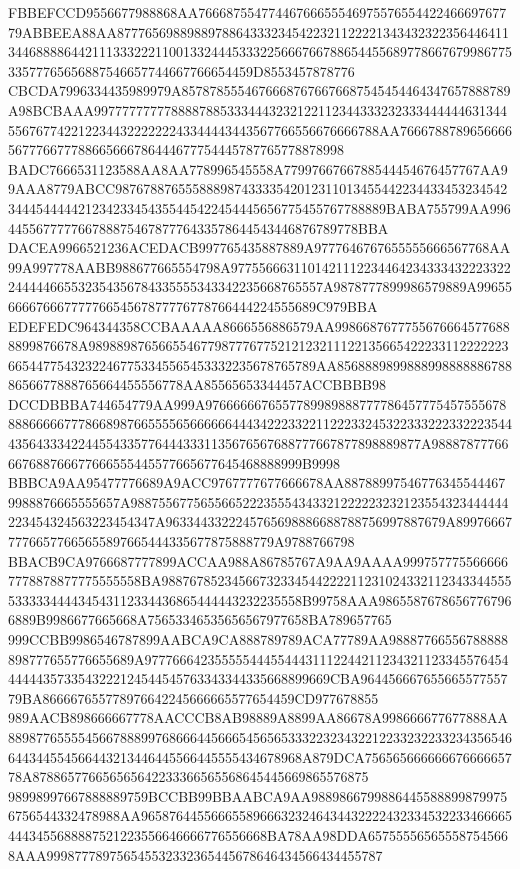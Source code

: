 FBBEFCCD9556677988868AA7666875547744676665554697557655442246669767779ABBEEA88AA8777656988988978864333234542232112222134343232235644641134468888644211133322211001332444533322566676678865445568977866767998677533577765656887546657744667766654459D8553457878776
CBCDA7996334435989979A85787855546766687676676687545454464347657888789A98BCBAAA9977777777788887885333444323212211234433323233344444463134455676774221223443222222243344443443567766556676666788AA7666788789656666567776677788665666786444677754445787765778878998
BADC7666531123588AA8AA778996545558A7799766766788544454676457767AA99AAA8779ABCC98767887655588898743333542012311013455442234433453234542344454444421234233454355445422454445656775455767788889BABA755799AA99644556777776678887546787776433578644543446876789778BBA
DACEA9966521236ACEDACB997765435887889A9777646767655555666567768AA99A997778AABB988677665554798A9775566631101421112234464234333432223322244444665532354356784335555343342235668765557A9878777899986579889A9965566667666777776654567877776778766444224555689C979BBA
EDEFEDC964344358CCBAAAAA8666556886579AA99866876777556766645776888899876678A98988987656655467798777677521212321112213566542223311222222366544775432322467753345565453332235678765789AA85688898998889988888867888656677888765664455556778AA85565653344457ACCBBBB98
DCCDBBBA744654779AA999A976666667655778998988877778645777545755567888866666777866898766555565666666444342223322112223324532233322233222354443564333422445543357764443331135676567688777667877898889877A98887877766667688766677666555445577665677645468888999B9998
BBBCA9AA95477776689A9ACC9767777677666678AA887889975467763455444679988876665555657A988755677565566522235554343321222223232123554323444444223454324563223454347A9633443322245765698886688788756997887679A8997666777766577665655897665444335677875888779A9788766798
BBACB9CA9766687777899ACCAA988A86785767A9AA9AAAA9997577755666667778878877775555558BA98876785234566732334544222211231024332112343344555533333444434543112334436865444443232235558B99758AAA98655876786567767966889B9986677665668A75653346535656567977658BA789657765
999CCBB9986546787899AABCA9CA888789789ACA77789AA98887766556788888898777655776655689A97776664235555544455444311122442112343211233455764544444435733543222124544545763343344335668899669CBA96445666765566557755779BA866667655778976642245666665577654459CD977678855
989AACB898666667778AACCCB8AB98889A8899AA86678A998666677677888AA889877655554566788899768666445666545656533322323432212233232233234356546644344554566443213446445566445555434678968A879DCA75656566666667666665778A878865776656565642233366565568645445669865576875
98998997667888889759BCCBB99BBAABCA9AA98898667998864455888998799756756544332478988AA965876445566655896663232464344322224323345322334666654443455688887521223556646666776556668BA78AA98DDA657555565655587545668AAA999877789756545532332365445678646434566434455787
